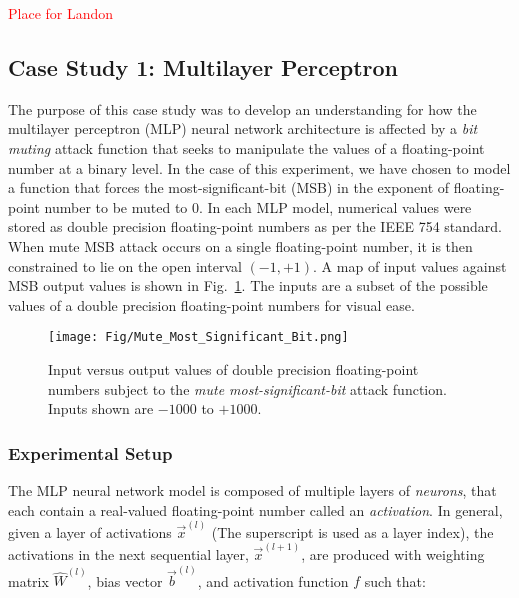 \documentclass[12pt,letterpaper]{article}
\begin{document}
\textcolor{red}{Place for Landon}


\subsection{Case Study 1: Multilayer Perceptron}

The purpose of this case study was to develop an understanding for how the multilayer perceptron (MLP) neural network architecture is affected by a \textit{bit muting} attack function that seeks to manipulate the values of a floating-point number at a binary level. In the case of this experiment, we have chosen to model a function that forces the most-significant-bit (MSB) in the exponent of floating-point number to be muted to $0$. In each MLP model, numerical values were stored as double precision floating-point numbers as per the IEEE 754 standard. 
When mute MSB attack occurs on a single floating-point number, it is then constrained to lie on the open interval $(-1,+1)$. A map of input values against MSB output values is shown in Fig.~\ref{fig-MUTEMSB}. The inputs are a subset of the possible values of a double precision floating-point numbers for visual ease.

\begin{figure}[h]
	\centering
	\texttt{[image: Fig/Mute\_Most\_Significant\_Bit.png]}
	\label{fig-MUTEMSB}
	\caption{Input versus output values of double precision floating-point numbers subject to the \textit{mute most-significant-bit} attack function. Inputs shown are $-1000$ to $+1000$.}
\end{figure}

\subsubsection{Experimental Setup}
The MLP neural network model is composed of multiple layers of \textit{neurons}, that each contain a real-valued floating-point number called an \textit{activation}.  
In general, given a layer of activations $\vec{x}^{(l)}$ (The superscript is used as a layer index), the activations in the next sequential layer, $\vec{x}^{(l+1)}$, are produced with weighting matrix $\hat{W}^{(l)}$, bias vector $\vec{b}^{(l)}$, and activation function $f$ such that:
\end{document}
